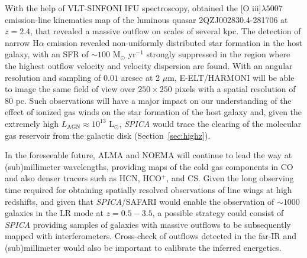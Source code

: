 \documentclass{pasa}%
\newcommand{\Lsun}{{\hbox {L$_\odot$}}}
\begin{document}
With the help of VLT-SINFONI IFU spectroscopy, \cite{can12}
obtained the [O {\sc iii}]$\lambda5007$ emission-line kinematics map of the 
luminous quasar 2QZJ002830.4-281706 at $z = 2.4$, that revealed 
a massive outflow on scales of several kpc. The detection of narrow 
H${\alpha}$ emission revealed non-uniformly distributed star 
formation in the host galaxy, with an SFR of $\sim 100$ M$_{\odot}$ 
yr$^{-1}$ strongly suppressed in the region where the highest 
outflow velocity and velocity dispersion are found. 
With an angular resolution and sampling of $0.01$ arcsec at 2 $\mu$m,  
E-ELT/HARMONI will be able to image the same field of 
view over $250\times250$ pixels with a spatial resolution of 80 pc.
Such observations will have a major impact on our understanding
of the effect of ionized gas winds on the star formation of the host galaxy 
and, given the extremely high $L_{\mathrm{AGN}}\approx10^{13}$ \Lsun,
{\it SPICA} would trace the clearing of the molecular gas reservoir from the
galactic disk (Section~\ref{sec:highz}). 



In the foreseeable future, ALMA and NOEMA will continue to lead the way at 
(sub)millimeter wavelengths, providing maps of the 
cold gas components in CO and also denser tracers such as 
HCN, HCO$^+$, and CS. Given the long observing time required for
  obtaining spatially resolved observations of line wings at high redshifts,
and given that {\it SPICA}/SAFARI would enable the observation of $\sim1000$
galaxies in the LR mode at $z=0.5-3.5$, a possible strategy could consist of 
{\it SPICA} providing samples of galaxies with massive outflows to be
subsequently mapped with interferometers. Cross-check of outflows 
detected in the far-IR and (sub)millimeter would also be important to 
calibrate the inferred energetics.
\end{document}
